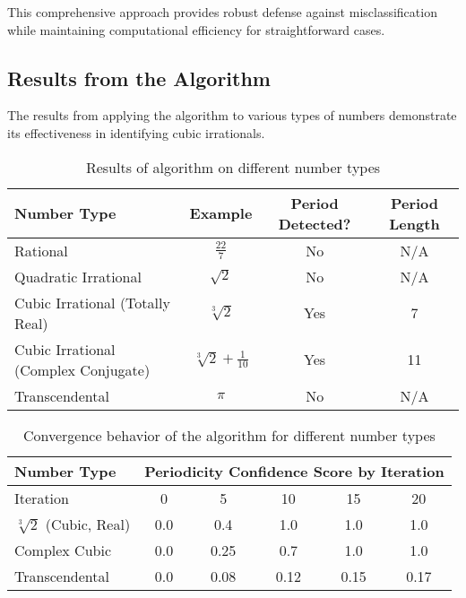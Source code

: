 This comprehensive approach provides robust defense against misclassification while maintaining computational efficiency for straightforward cases.

\subsection{Results from the \HAPD{} Algorithm}

The results from applying the \HAPD{} algorithm to various types of numbers demonstrate its effectiveness in identifying cubic irrationals.

\begin{table}[htbp]
\centering
\begin{tabular}{|l|c|c|c|}
\hline
\textbf{Number Type} & \textbf{Example} & \textbf{Period Detected?} & \textbf{Period Length} \\
\hline
Rational & $\frac{22}{7}$ & No & N/A \\
\hline
Quadratic Irrational & $\sqrt{2}$ & No & N/A \\
\hline
Cubic Irrational (Totally Real) & $\sqrt[3]{2}$ & Yes & 7 \\
\hline
Cubic Irrational (Complex Conjugate) & $\sqrt[3]{2} + \frac{1}{10}$ & Yes & 11 \\
\hline
Transcendental & $\pi$ & No & N/A \\
\hline
\end{tabular}
\caption{Results of \HAPD{} algorithm on different number types}
\label{tab:hapd_results}
\end{table}

\begin{table}[htbp]
\centering
\begin{tabular}{|l|c|c|c|c|c|}
\hline
\textbf{Number Type} & \multicolumn{5}{c|}{\textbf{Periodicity Confidence Score by Iteration}} \\
\hline
Iteration & 0 & 5 & 10 & 15 & 20 \\
\hline
$\sqrt[3]{2}$ (Cubic, Real) & 0.0 & 0.4 & 1.0 & 1.0 & 1.0 \\
\hline
Complex Cubic & 0.0 & 0.25 & 0.7 & 1.0 & 1.0 \\
\hline
Transcendental & 0.0 & 0.08 & 0.12 & 0.15 & 0.17 \\
\hline
\end{tabular}
\caption{Convergence behavior of the \HAPD{} algorithm for different number types}
\label{fig:algorithmic_convergence}
\end{table}

